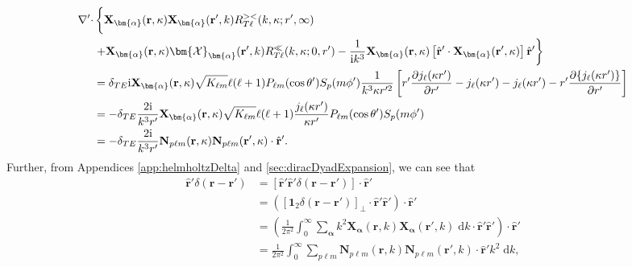 \begin{equation}
\begin{split}
\nabla'\cdot&\left\{ \vphantom{\frac{1}{k^3}} \mathbf{X}_{\bm{\alpha}}(\mathbf{r},\kappa)\mathbf{X}_{\bm{\alpha}}(\mathbf{r}',k)R_{T\ell}^{><}(k,\kappa;r',\infty)\right.\\
&\left.+ \mathbf{X}_{\bm{\alpha}}(\mathbf{r},\kappa)\bm{\mathcal{X}}_{\bm{\alpha}}(\mathbf{r}',k)R_{T\ell}^\ll(k,\kappa;0,r') - \frac{1}{\mathrm{i}k^3}\mathbf{X}_{\bm{\alpha}}(\mathbf{r},\kappa)\left[\hat{\mathbf{r}}'\cdot\mathbf{X}_{\bm{\alpha}}(\mathbf{r}',\kappa)\right]\hat{\mathbf{r}}'\right\}\\
&= \delta_{TE}\mathrm{i}\mathbf{X}_{\bm{\alpha}}(\mathbf{r},\kappa)\sqrt{K_{\ell m}}\ell(\ell + 1)P_{\ell m}(\cos\theta')S_p(m\phi')\frac{1}{k^3\kappa r'^2}\left[r'\frac{\partial j_\ell(\kappa r')}{\partial r'} - j_\ell(\kappa r') - j_\ell(\kappa r') - r'\frac{\partial\{j_\ell(\kappa r')\}}{\partial r'}\right]\\
&= -\delta_{TE}\frac{2\mathrm{i}}{k^3r'}\mathbf{X}_{\bm{\alpha}}(\mathbf{r},\kappa)\sqrt{K_{\ell m}}\ell(\ell + 1)\frac{j_\ell(\kappa r')}{\kappa r'}P_{\ell m}(\cos\theta')S_p(m\phi')\\
&= -\delta_{TE}\frac{2\mathrm{i}}{k^3r'}\mathbf{N}_{p\ell m}(\mathbf{r},\kappa)\mathbf{N}_{p\ell m}(\mathbf{r}',\kappa)\cdot\hat{\mathbf{r}}'.
\end{split}
\end{equation}
Further, from Appendices \ref{app:helmholtzDelta} and \ref{sec:diracDyadExpansion}, we can see that
\begin{equation}
\begin{split}
\hat{\mathbf{r}}'\delta(\mathbf{r} - \mathbf{r}') &= \left[\hat{\mathbf{r}}'\hat{\mathbf{r}}'\delta(\mathbf{r} - \mathbf{r}')\right]\cdot\hat{\mathbf{r}}'\\
&= \left(\left[\bm{1}_2\delta(\mathbf{r} - \mathbf{r}')\right]_\perp\cdot\hat{\mathbf{r}}'\hat{\mathbf{r}}'\right)\cdot\hat{\mathbf{r}}'\\
&= \left(\frac{1}{2\pi^2}\int_0^\infty\sum_{\bm{\alpha}}k^2\mathbf{X}_{\bm{\alpha}}(\mathbf{r},k)\mathbf{X}_{\bm{\alpha}}(\mathbf{r}',k)\;\mathrm{d}k\cdot\hat{\mathbf{r}}'\hat{\mathbf{r}}'\right)\cdot\hat{\mathbf{r}}'\\
&= \frac{1}{2\pi^2}\int_0^\infty\sum_{p\ell m}\mathbf{N}_{p\ell m}(\mathbf{r},k)\mathbf{N}_{p\ell m}(\mathbf{r}',k)\cdot\hat{\mathbf{r}}'k^2\;\mathrm{d}k,
\end{split}
\end{equation}
